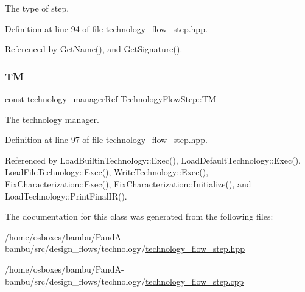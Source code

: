 The type of step. 



Definition at line 94 of file technology\+\_\+flow\+\_\+step.\+hpp.



Referenced by Get\+Name(), and Get\+Signature().

\mbox{\label{classTechnologyFlowStep_a4aeea30129ed65348c3bad932b3a135b}} 
\subsubsection{\texorpdfstring{TM}{TM}}
{\footnotesize\ttfamily const \hyperlink{technology__manager_8hpp_a4b9ecd440c804109c962654f9227244e}{technology\+\_\+manager\+Ref} Technology\+Flow\+Step\+::\+TM\hspace{0.3cm}{\ttfamily [protected]}}



The technology manager. 



Definition at line 97 of file technology\+\_\+flow\+\_\+step.\+hpp.



Referenced by Load\+Builtin\+Technology\+::\+Exec(), Load\+Default\+Technology\+::\+Exec(), Load\+File\+Technology\+::\+Exec(), Write\+Technology\+::\+Exec(), Fix\+Characterization\+::\+Exec(), Fix\+Characterization\+::\+Initialize(), and Load\+Technology\+::\+Print\+Final\+I\+R().



The documentation for this class was generated from the following files\+:\begin{DoxyCompactItemize}
\item 
/home/osboxes/bambu/\+Pand\+A-\/bambu/src/design\+\_\+flows/technology/\hyperlink{technology__flow__step_8hpp}{technology\+\_\+flow\+\_\+step.\+hpp}\item 
/home/osboxes/bambu/\+Pand\+A-\/bambu/src/design\+\_\+flows/technology/\hyperlink{technology__flow__step_8cpp}{technology\+\_\+flow\+\_\+step.\+cpp}\end{DoxyCompactItemize}
